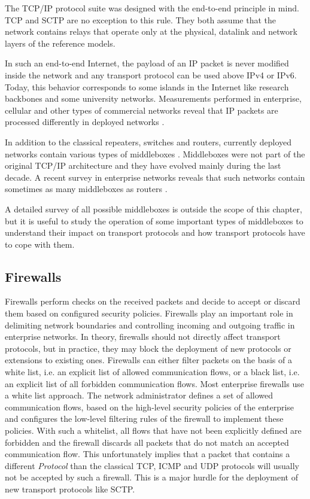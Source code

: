The TCP/IP protocol suite was designed with the end-to-end principle \cite{saltzer1984end} in mind. TCP and SCTP are no exception to this rule. They both assume that the network contains relays that operate only at the physical, datalink and network layers of the reference models. 

In such an end-to-end Internet, the payload of an IP packet is never modified inside the network and any transport protocol can be used above IPv4 or IPv6. Today, this behavior corresponds to some islands in the Internet like research backbones and some university networks. Measurements performed in enterprise, cellular and other types of commercial networks reveal that IP packets are processed differently in deployed networks \cite{honda2011still,wang2011untold}.

In addition to the classical repeaters, switches and routers, currently deployed networks contain various types of middleboxes \cite{rfc3234}.  Middleboxes were not part of the original TCP/IP architecture and they have evolved mainly during the last decade. A recent survey in enterprise networks reveals that such networks contain sometimes as many middleboxes as routers \cite{sherry2012making}. 

A detailed survey of all possible middleboxes is outside the scope of this chapter, but it is useful to study the operation of some important types of middleboxes to understand their impact on transport protocols and how transport protocols have to cope with them. 

\subsection{Firewalls}

Firewalls perform checks on the received packets and decide to accept or discard them based on configured security policies. Firewalls play an important role in delimiting network boundaries and controlling incoming and outgoing traffic in enterprise networks. In theory, firewalls should not directly affect transport protocols, but in practice, they may block the deployment of new protocols or extensions to existing ones. Firewalls can either filter packets on the basis of a white list, i.e. an explicit list of allowed communication flows, or a black list, i.e. an explicit list of all forbidden communication flows. Most enterprise firewalls use a white list approach. The network administrator defines a set of allowed communication flows, based on the high-level security policies of the enterprise and configures the low-level filtering rules of the firewall to implement these policies. With such a whitelist, all flows that have not been explicitly defined are forbidden and the firewall discards all packets that do not match an accepted communication flow. This unfortunately implies that a packet that contains a different \emph{Protocol} than the classical TCP, ICMP and UDP protocols will usually not be accepted by such a firewall. This is a major hurdle for the deployment of new transport protocols like SCTP. 

